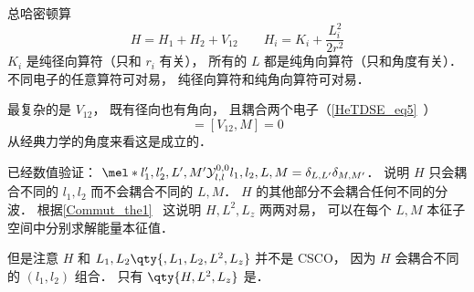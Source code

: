 
总哈密顿算
\begin{equation}
H = H_1 + H_2 + V_{12} \qquad H_i = K_i + \frac{L_i^2}{2r^2}
\end{equation}
$K_i$ 是纯径向算符（只和 $r_i$ 有关）， 所有的 $L$ 都是纯角向算符（只和角度有关）． 不同电子的任意算符可对易， 纯径向算符和纯角向算符可对易．

最复杂的是 $V_{12}$， 既有径向也有角向， 且耦合两个电子（\autoref{HeTDSE_eq5}~）
\begin{equation}
[V_{12}, L^2] = [V_{12}, M] = 0
\end{equation}
从经典力学的角度来看这是成立的．

已经数值验证： $\mel*{l'_1,l'_2,L',M'}{\mathcal Y_{l,l}^{0,0}}{l_1,l_2,L,M} = \delta_{L,L'}\delta_{M,M'}$． 说明 $H$ 只会耦合不同的 $l_1,l_2$ 而不会耦合不同的 $L,M$． $H$ 的其他部分不会耦合任何不同的分波． 根据\autoref{Commut_the1}~ 这说明 $H,L^2,L_z$ 两两对易， 可以在每个 $L,M$ 本征子空间中分别求解能量本征值．

但是注意 $H$ 和 $L_1, L_2\qty{,L_1,L_2,L^2,L_z}$ 并不是 CSCO， 因为 $H$ 会耦合不同的 $(l_1,l_2)$ 组合． 只有 $\qty{H,L^2,L_z}$ 是．
